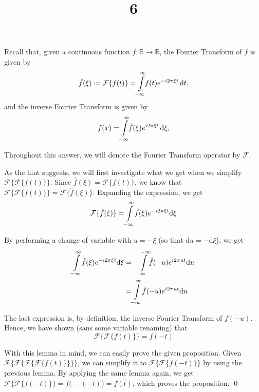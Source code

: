 \documentclass[a4paper]{article}
\title{6}
\date{}
\newcommand{\F}{\mathcal{F}}
\newcommand{\R}{\mathbb{R}}
\newcommand{\infint}{\int\limits_{\mathclap{-\infty}}^{\mathclap{\infty}}}\renewcommand{\d}{\mathrm{d}}
\begin{document}
\maketitle

Recall that, given a continuous function $f\colon \R \to \R$, the Fourier Transform of $f$ is given by
\begin{equation*}
\hat{f}(\xi) \coloneq \F\{f(t)\} = \infint \! f(t) e^{-i2\pi \xi t} \, \d t,
\end{equation*}
and the inverse Fourier Transform is given by
\begin{equation*}
f(x) = \infint \! \hat{f}(\xi) e^{i2\pi \xi t} \, \d \xi,
\end{equation*}

Throughout this answer, we will denote the Fourier Transform operator by $\F$.

\bigskip

As the hint suggests, we will first investigate what we get when we simplify $\F\{\F\{f(t)\}\}$. Since $\hat{f}(\xi) = \F\{f(t)\}$, we know that $\F\{\F\{f(t)\}\} = \F\{\hat{f}(\xi)\}$. Expanding the expression, we get 
\begin{equation*}
\F\{\hat{f}(\xi)\} = \infint \hat{f}(\xi) e^{-i2\pi \xi t} \d \xi
\end{equation*}

By performing a change of variable with $u = -\xi$ (so that $\d u = -\d \xi$), we get
\begin{align*}
\infint \hat{f}(\xi) e^{-i2\pi \xi t} \d \xi &= -\int\limits_{\mathclap{\infty}}^{\mathclap{-\infty}} \hat{f}(-u) e^{i2\pi u t} \d u \\
&= \infint \hat{f}(-u) e^{i2\pi u t} \d u
\end{align*}

The last expression is, by definition, the inverse Fourier Transform of $f(-u)$. Hence, we have shown (sans some variable renaming) that
\begin{equation*}
\F\{\F\{f(t)\}\} = f(-t)
\end{equation*}

With this lemma in mind, we can easily prove the given proposition. Given $\F\{\F\{\F\{\F\{f(t)\}\}\}\}$, we can simplify it to $\F\{\F\{f(-t)\}\}$ by using the previous lemma. By applying the same lemma again, we get$\F\{\F\{f(-t)\}\} = f\big(-(-t)\big) = f(t)$, which proves the proposition. \qed
\end{document}
